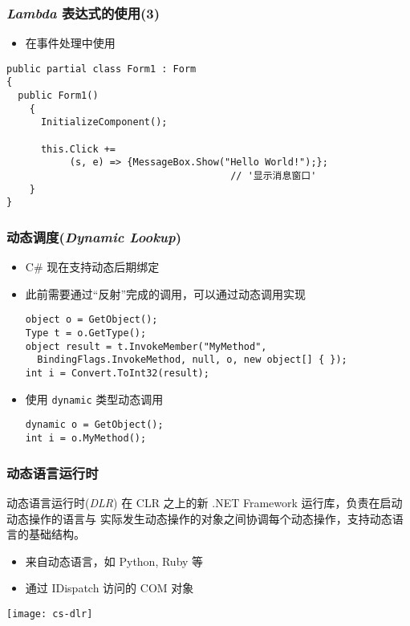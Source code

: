 \begin{frame}[fragile]
\frametitle{\textit{Lambda} 表达式的使用(3)}
\begin{itemize}
\item 在事件处理中使用
\end{itemize}
\begin{lstlisting}[escapeinside='']
public partial class Form1 : Form
{
  public Form1()
    {
      InitializeComponent();

      this.Click +=
           (s, e) => {MessageBox.Show("Hello World!");};
                                       // '显示消息窗口'
    }
}
\end{lstlisting}
\end{frame}

\begin{frame}[fragile]
\frametitle{动态调度(\textit{Dynamic Lookup})}
\begin{itemize}
\item C\# 现在支持动态后期绑定
\item 此前需要通过“反射”完成的调用，可以通过动态调用实现
\begin{lstlisting}
object o = GetObject();
Type t = o.GetType();
object result = t.InvokeMember("MyMethod", 
  BindingFlags.InvokeMethod, null, o, new object[] { });
int i = Convert.ToInt32(result);
\end{lstlisting}
\item 使用 \lstinline|dynamic| 类型动态调用
\begin{lstlisting}
dynamic o = GetObject();
int i = o.MyMethod();
\end{lstlisting}
\end{itemize}
\end{frame}

\begin{frame}
\frametitle{动态语言运行时}
\begin{block}{动态语言运行时(\textit{DLR})}
  \CJKindent 在 CLR 之上的新 .NET Framework 运行库，负责在启动动态操作的语言与
  实际发生动态操作的对象之间协调每个动态操作，支持动态语言的基础结构。
\end{block}
\begin{itemize}
\item 来自动态语言，如 Python, Ruby 等
\item 通过 IDispatch 访问的 COM 对象
\end{itemize}
\centering \texttt{[image: cs-dlr]}

\end{frame}

